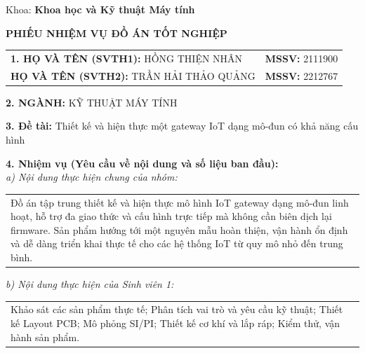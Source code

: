 \vspace{5pt}

\hphantom{..}Khoa: \textbf{Khoa học và Kỹ thuật Máy tính}\hfill 

\vspace{10pt}

\begin{center}
    \textbf{\fontsize{14}{16}\selectfont PHIẾU NHIỆM VỤ ĐỒ ÁN TỐT NGHIỆP}
\end{center}

\vspace{10pt}


    \begin{tabular}{l l}
    \textbf{1. HỌ VÀ TÊN (SVTH1):} HỒNG THIỆN NHÂN & \textbf{MSSV:} 2111900 \\
    \textbf{\hphantom{1. }HỌ VÀ TÊN (SVTH2):} TRẦN HẢI THẢO QUẢNG & \textbf{MSSV:} 2212767 \\
    \end{tabular}

\hphantom{..}\textbf{2. NGÀNH:} KỸ THUẬT MÁY TÍNH

\hphantom{..}\textbf{3. Đề tài:} Thiết kế và hiện thực một gateway IoT dạng mô-đun có khả năng cấu hình

\hphantom{..}\textbf{4. Nhiệm vụ (Yêu cầu về nội dung và số liệu ban đầu):} \\
\hphantom{..}\textit{a) Nội dung thực hiện chung của nhóm:} \\
\begin{tabular}{p{\textwidth}}
Đồ án tập trung thiết kế và hiện thực mô hình IoT gateway dạng mô-đun linh hoạt, hỗ trợ đa giao thức và cấu hình trực tiếp mà không cần biên dịch lại firmware. Sản phẩm hướng tới một nguyên mẫu hoàn thiện, vận hành ổn định và dễ dàng triển khai thực tế cho các hệ thống IoT từ quy mô nhỏ đến trung bình.    
\end{tabular}

\hphantom{..}\textit{b) Nội dung thực hiện của Sinh viên 1:} \\
\begin{tabular}{p{\textwidth}}
Khảo sát các sản phẩm thực tế; Phân tích vai trò và yêu cầu kỹ thuật; Thiết kế Layout PCB; Mô phỏng SI/PI; Thiết kế cơ khí và lắp ráp; Kiểm thử, vận hành sản phẩm.
\end{tabular}

